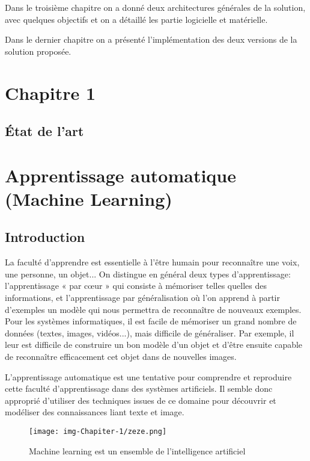 \documentclass[12pt]{article}
\begin{document}
Dans le troisième chapitre on a donné deux architectures générales de la solution, avec quelques objectifs et on a détaillé les partie logicielle et matérielle. 

Dans le dernier chapitre on a présenté l’implémentation des deux versions de la solution proposée.

\newpage
{}
\rhead{\textsc{}}
\section*{\Huge{Chapitre 1}}
\subsection*{\huge{\' Etat de l'art}}
\newpage
{}
\section{Apprentissage automatique (Machine Learning)}
\subsection{Introduction}
La faculté d'apprendre est essentielle à l'être humain pour reconnaître une voix, une personne, un objet... On distingue en général deux types d'apprentissage: l'apprentissage « par cœur » qui consiste à mémoriser telles quelles des informations, et l'apprentissage par généralisation où l'on apprend à partir d'exemples un modèle qui nous permettra de reconnaître de nouveaux exemples. Pour les systèmes informatiques, il est facile de mémoriser un grand nombre de données (textes, images, vidéos...), mais difficile de généraliser. Par exemple, il leur est difficile de construire un bon modèle d'un objet et d'être ensuite capable de reconnaître efficacement cet objet dans de nouvelles images.

L'apprentissage automatique est une tentative pour comprendre et reproduire cette faculté d'apprentissage dans des systèmes artificiels. Il semble donc approprié d'utiliser des techniques issues de ce domaine pour découvrir et modéliser des connaissances liant texte et image.

\begin{figure}[h]
	\centering
	\texttt{[image: img-Chapiter-1/zeze.png]}
	\caption{Machine learning est un ensemble de l’intelligence artificiel}
\end{figure}
\end{document}
